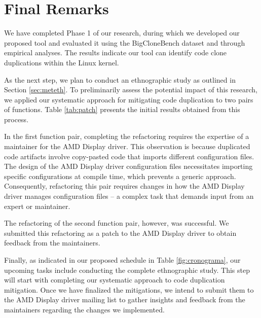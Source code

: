 \en

\section{Final Remarks}

We have completed Phase 1 of our research, during which we developed our proposed tool and evaluated it using the BigCloneBench dataset and through empirical analyses. The results indicate our tool can identify code clone duplications within the Linux kernel.

As the next step, we plan to conduct an ethnographic study as outlined in Section \ref{sec:meteth}. To preliminarily assess the potential impact of this research, we applied our systematic approach for mitigating code duplication to two pairs of functions. Table \ref{tab:patch} presents the initial results obtained from this process.



In the first function pair, completing the refactoring requires the expertise of a maintainer for the AMD Display driver. This observation is because duplicated code artifacts involve copy-pasted code that imports different configuration files. The design of the AMD Display driver configuration files necessitates importing specific configurations at compile time, which prevents a generic approach. Consequently, refactoring this pair requires changes in how the AMD Display driver manages configuration files -- a complex task that demands input from an expert or maintainer.

The refactoring of the second function pair, however, was successful. We submitted this refactoring as a patch to the AMD Display driver to obtain feedback from the maintainers.



Finally, as indicated in our proposed schedule in Table \ref{fig:cronograma}, our upcoming tasks include conducting the complete ethnographic study. This step will start with completing our systematic approach to code duplication mitigation. Once we have finalized the mitigations, we intend to submit them to the AMD Display driver mailing list to gather insights and feedback from the maintainers regarding the changes we implemented.



